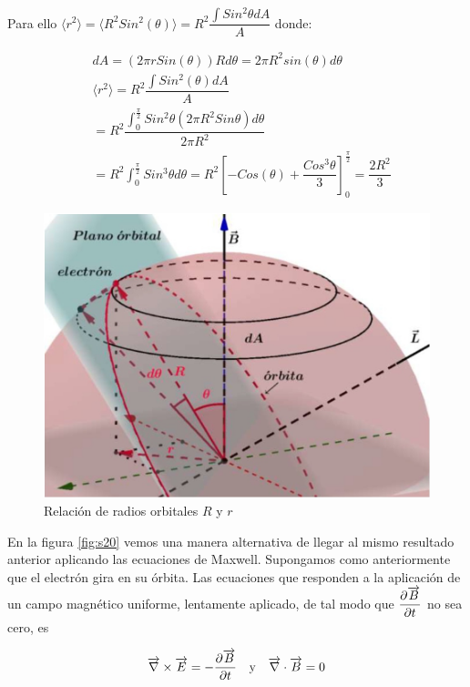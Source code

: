 Para ello $\langle r^{2} \rangle= \langle R^{2} Sin^{2}(\theta)\rangle = R^{2} \dfrac{\int Sin^{2} \theta dA}{A}$ donde:

\begin{equation}
\begin{aligned}
&dA= (2\pi r Sin(\theta) ) R d\theta = 2 \pi R^{2} sin(\theta) d\theta \\
&\langle r^{2} \rangle = R^{2} \dfrac{\int Sin^{2}(\theta) dA}{A} \\
&=R^{2} \dfrac{\int_{0}^{\frac{\pi}{2}}Sin^{2}\theta(2\pi R^{2} Sin\theta)d\theta}{2\pi R^{2}}\\
&=R^{2}\int_{0}^{\frac{\pi}{2}} Sin^{3}\theta d\theta=R^{2}\left[ -Cos(\theta)+\dfrac{Cos^{3}\theta}{3}\right] _{0}^{\frac{\pi}{2}}= \dfrac{2R^{2}}{3}
\end{aligned}
\end{equation}

\begin{figure}[H]
    \centering
    \includegraphics[width=1.0\textwidth]{./Figures/fig_s19}
	\caption{Relación de radios orbitales $R$ y $r$}
	\label{fig:s19}
\end{figure}

En la figura \ref{fig:s20} vemos una manera alternativa de llegar al mismo resultado anterior aplicando las ecuaciones de Maxwell. Supongamos como anteriormente que el electrón gira en su órbita. Las ecuaciones que responden a la aplicación de un campo magnético uniforme, lentamente aplicado, de tal modo que $\dfrac{\partial \overrightarrow{B}}{\partial t}$ no sea cero, es

\begin{equation*}
	\overrightarrow{\nabla}\times\overrightarrow{E}= -\dfrac{\partial \overrightarrow{B}}{\partial t} \quad \text{y} \quad \overrightarrow{\nabla}\cdot\overrightarrow{B}=0
\end{equation*}


